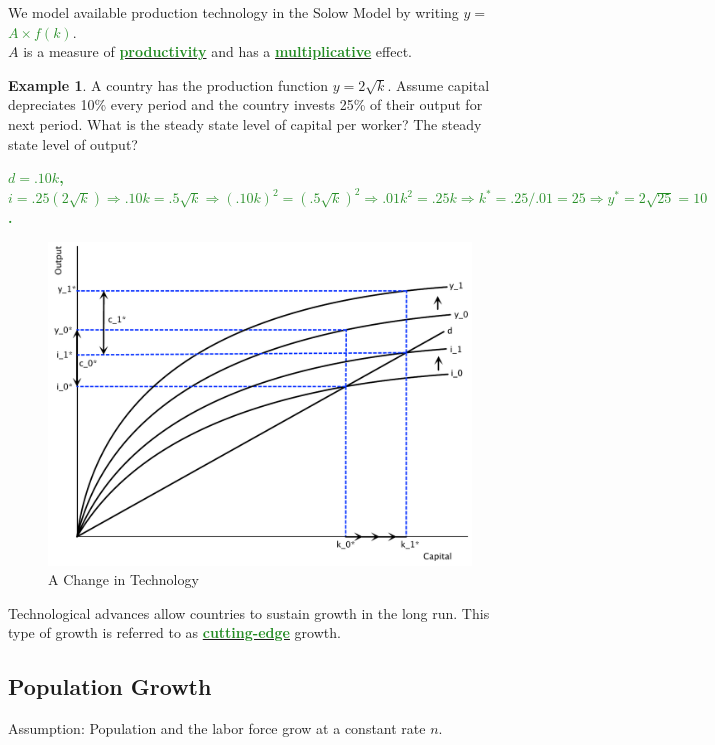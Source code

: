 \documentclass[11pt]{article}\usepackage[]{graphicx}\usepackage[]{color}
\theoremstyle{definition}
\newtheorem{exmp}{Example}[section]
\newcommand{\blank}[1]{}
\newcommand{\ddp}[1]{{\textbf{\textcolor{ForestGreen}{#1}}}}
\newcommand{\dd}[1]{{\underline{\textbf{\textcolor{ForestGreen}{#1}}}}}
\begin{document}
We model available production technology in the Solow Model by writing $y = $ \dd{$A \times f(k)$}.
\\

$A$ is a measure of \dd{productivity} and has a \dd{multiplicative} effect.
\\

\begin{exmp}
A country has the production function $y = 2\sqrt{k} $. Assume capital depreciates 10\% every period and the country invests 25\% of their output for next period. What is the steady state level of capital per worker? The steady state level of output?
\end{exmp} 
\ddp{$d = .10k$, $i=.25(2\sqrt{k}) \Rightarrow .10k = .5\sqrt{k} \Rightarrow (.10k)^2 = (.5\sqrt{k})^2 \Rightarrow .01k^2 = .25k \Rightarrow k^* = .25/.01 = 25 \Rightarrow y^* = 2\sqrt{25} = 10$.}
\blank{}
\blank{}

	\begin{figure}[H]
		\centering
		\includegraphics[scale=.40]{plot88.pdf}
		\caption{A Change in Technology}
	\end{figure}

Technological advances allow countries to sustain growth in the long run. This type of growth is referred to as \dd{cutting-edge} growth.
\subsection{Population Growth}

Assumption: Population and the labor force grow at a constant rate $n$. 
\\
\end{document}
